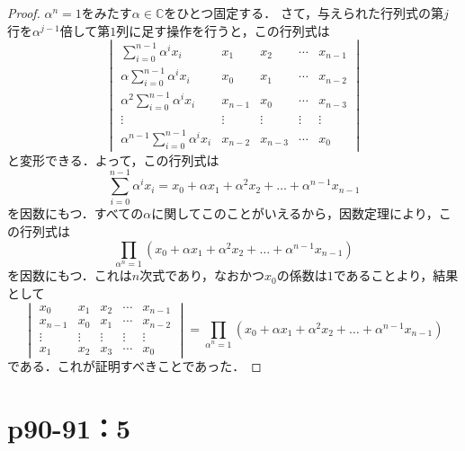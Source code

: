 \documentclass[a4paper,10pt,fleqn]{ltjsarticle}
\begin{document}
\begin{leftbar}
    \begin{proof}
        $\alpha ^n =1$をみたす$\alpha \in \mathbb{C}$をひとつ固定する．
        さて，与えられた行列式の第$j$行を$\alpha^{j-1}$倍して第$1$列に足す操作を行うと，この行列式は
        \[
            \begin{vmatrix}
                \sum_{i=0}^{n-1} \alpha^i x_i              & x_1     & x_2     & \cdots & x_{n-1} \\
                \alpha \sum_{i=0}^{n-1} \alpha^i x_i       & x_0     & x_1     & \cdots & x_{n-2} \\
                \alpha^2 \sum_{i=0}^{n-1} \alpha^i x_i     & x_{n-1} & x_0     & \cdots & x_{n-3} \\
                \vdots                                     & \vdots  & \vdots  & \vdots & \vdots  \\
                \alpha^{n-1} \sum_{i=0}^{n-1} \alpha^i x_i & x_{n-2} & x_{n-3} & \cdots & x_0
            \end{vmatrix}
        \]
        と変形できる．よって，この行列式は
        \[
            \sum_{i=0}^{n-1} \alpha^i x_i = x_0 + \alpha x_1 + \alpha^2 x_2 + \dots +\alpha^{n-1} x_{n-1}
        \]
        を因数にもつ．すべての$\alpha$に関してこのことがいえるから，因数定理により，この行列式は
        \[
            \prod_{\alpha^n=1} (x_0 + \alpha x_1 + \alpha^2 x_2 + \dots +\alpha^{n-1} x_{n-1})
        \]
        を因数にもつ．これは$n$次式であり，なおかつ$x_0$の係数は$1$であることより，結果として
        \[
            \begin{vmatrix}
                x_0     & x_1    & x_2    & \cdots & x_{n-1} \\
                x_{n-1} & x_0    & x_1    & \cdots & x_{n-2} \\
                \vdots  & \vdots & \vdots & \vdots & \vdots  \\
                x_1     & x_2    & x_3    & \cdots & x_0
            \end{vmatrix}
            =  \prod_{\alpha^n=1} (x_0 + \alpha x_1 + \alpha^2 x_2 + \dots +\alpha^{n-1} x_{n-1})
        \]
        である．これが証明すべきことであった．
    \end{proof}
\end{leftbar}


\section*{p90-91：5}
\end{document}
